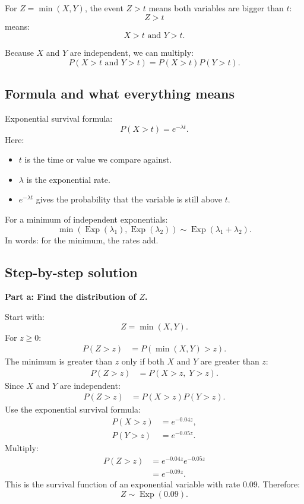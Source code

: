 \documentclass[11pt,a4paper]{article}
\begin{document}
For \(Z=\min(X,Y)\), the event \(Z>t\) means both variables are bigger than \(t\):
\[
Z>t
\]
means:
\[
X>t \text{ and } Y>t.
\]

Because \(X\) and \(Y\) are independent, we can multiply:
\[
P(X>t \text{ and } Y>t)=P(X>t)P(Y>t).
\]

\subsection*{Formula and what everything means}
Exponential survival formula:
\[
P(X>t)=e^{-\lambda t}.
\]
Here:
\begin{itemize}[leftmargin=*]
    \item \(t\) is the time or value we compare against.
    \item \(\lambda\) is the exponential rate.
    \item \(e^{-\lambda t}\) gives the probability that the variable is still above \(t\).
\end{itemize}

For a minimum of independent exponentials:
\[
\min(\operatorname{Exp}(\lambda_1),\operatorname{Exp}(\lambda_2))
\sim \operatorname{Exp}(\lambda_1+\lambda_2).
\]
In words: for the minimum, the rates add.

\subsection*{Step-by-step solution}
\textbf{Part a: Find the distribution of \(Z\).}

Start with:
\[
Z=\min(X,Y).
\]
For \(z\ge 0\):
\begin{align*}
P(Z>z)
&=P(\min(X,Y)>z).
\end{align*}
The minimum is greater than \(z\) only if both \(X\) and \(Y\) are greater than \(z\):
\begin{align*}
P(Z>z)
&=P(X>z,\;Y>z).
\end{align*}
Since \(X\) and \(Y\) are independent:
\begin{align*}
P(Z>z)
&=P(X>z)P(Y>z).
\end{align*}
Use the exponential survival formula:
\begin{align*}
P(X>z)&=e^{-0.04z},\\
P(Y>z)&=e^{-0.05z}.
\end{align*}
Multiply:
\begin{align*}
P(Z>z)
&=e^{-0.04z}e^{-0.05z}\\
&=e^{-0.09z}.
\end{align*}
This is the survival function of an exponential variable with rate \(0.09\). Therefore:
\[
Z\sim \operatorname{Exp}(0.09).
\]
\end{document}
